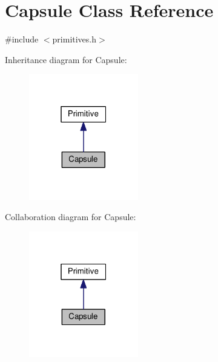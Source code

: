 \hypertarget{class_capsule}{}\section{Capsule Class Reference}
\label{class_capsule}


{\ttfamily \#include $<$primitives.\+h$>$}



Inheritance diagram for Capsule\+:\nopagebreak
\begin{figure}[H]
\begin{center}
\leavevmode
\includegraphics[width=135pt]{class_capsule__inherit__graph}
\end{center}
\end{figure}


Collaboration diagram for Capsule\+:\nopagebreak
\begin{figure}[H]
\begin{center}
\leavevmode
\includegraphics[width=135pt]{class_capsule__coll__graph}
\end{center}
\end{figure}
